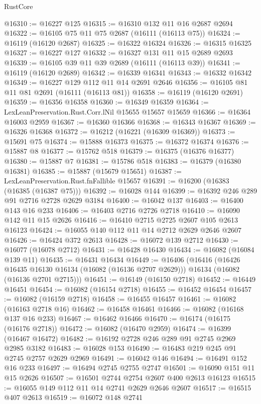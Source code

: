 \begin{lexlean}{RustCore}
\begin{coremodule}
@16310 := @16227 @125
@16315 := @16310 @132 @11 @16 @2687 @2694
@16322 := @16105 @75 @11 @75 @2687 (@16111 (@16113 @75))
@16324 := @16119 (@16120 @2687)
@16325 := @16322 @16324
@16326 := @16315 @16325
@16327 := @16227 @127
@16332 := @16327 @131 @11 @15 @2689 @2693
@16339 := @16105 @39 @11 @39 @2689 (@16111 (@16113 @39))
@16341 := @16119 (@16120 @2689)
@16342 := @16339 @16341
@16343 := @16332 @16342
@16349 := @16227 @129 @112 @11 @14 @2691 @2646
@16356 := @16105 @81 @11 @81 @2691 (@16111 (@16113 @81))
@16358 := @16119 (@16120 @2691)
@16359 := @16356 @16358
@16360 := @16349 @16359
@16364 := LexLeanPreservation.Rust.Corr.lNil @15655 @15657 @15659
@16366 := @16364 @16003 @2959
@16367 := @16360 @16366
@16368 := @16343 @16367
@16369 := @16326 @16368
@16372 := @16212 (@16221 (@16309 @16369))
@16373 := @15691 @75
@16374 := @15888 @16373
@16375 := @16372 @16374
@16376 := @15887 @8
@16377 := @15762 @518
@16379 := @16375 (@16376 @16377)
@16380 := @15887 @7
@16381 := @15786 @518
@16383 := @16379 (@16380 @16381)
@16385 := @15887 (@15679 @15651)
@16387 := LexLeanPreservation.Rust.fnFallible @15657
@16391 := @16200 (@16383 (@16385 (@16387 @75)))
@16392 := @16028 @144
@16399 := @16392 @246 @289 @91 @2716 @2728 @2629 @3184
@16400 := @16042 @137
@16403 := @16400 @143 @16 @233
@16406 := @16403 @2716 @2726 @2718
@16410 := @16090 @142 @11 @15 @2626
@16416 := @16410 @2715 @2725 @2607 @105 @2613 @16123
@16424 := @16055 @140 @112 @11 @14 @2712 @2629 @2646 @2607
@16426 := @16424 @372 @2613
@16428 := @16072 @139 @2712
@16430 := @16077 (@16078 @2712)
@16431 := @16428 @16430
@16434 := @16082 (@16084 @139 @11)
@16435 := @16431 @16434
@16449 := @16406
    (@16416
      (@16426 @16435 @16130 @16134 (@16082 (@16136 @2707 @2629)))
      @16134
      (@16082 (@16136 @2701 @2715)))
@16451 := @16149 (@16150 @2718)
@16452 := @16449 @16451
@16454 := @16082 (@16154 @2718)
@16455 := @16452 @16454
@16457 := @16082 (@16159 @2718)
@16458 := @16455 @16457
@16461 := @16082 (@16163 @2718 @16)
@16462 := @16458 @16461
@16466 := @16082 (@16168 @137 @16 @233)
@16467 := @16462 @16466
@16470 := @16174 (@16175 (@16176 @2718))
@16472 := @16082 (@16470 @2959)
@16474 := @16399 (@16467 @16472)
@16482 := @16192 @2728 @246 @289 @91 @2745 @2969 @2985 @3182
@16483 := @16028 @153
@16490 := @16483 @219 @245 @91 @2745 @2757 @2629 @2969
@16491 := @16042 @146
@16494 := @16491 @152 @16 @233
@16497 := @16494 @2745 @2755 @2747
@16501 := @16090 @151 @11 @15 @2626
@16507 := @16501 @2744 @2754 @2607 @400 @2613 @16123
@16515 := @16055 @149 @112 @11 @14 @2741 @2629 @2646 @2607
@16517 := @16515 @407 @2613
@16519 := @16072 @148 @2741

\end{coremodule}
\end{lexlean}
